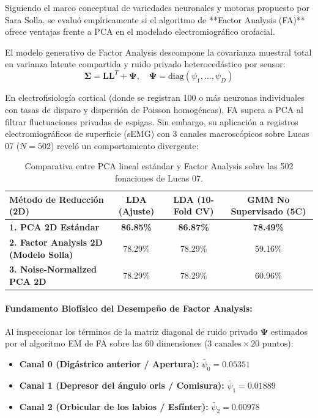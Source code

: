 \documentclass[11pt,a4paper,openany]{book}
\theoremstyle{definition}
\begin{document}
Siguiendo el marco conceptual de variedades neuronales y motoras propuesto por Sara Solla, se evaluó empíricamente si el algoritmo de **Factor Analysis (FA)** ofrece ventajas frente a PCA en el modelado electromiográfico orofacial.

El modelo generativo de Factor Analysis descompone la covarianza muestral total en varianza latente compartida y ruido privado heterocedástico por sensor:
\begin{equation}
\boldsymbol{\Sigma} = \mathbf{L} \mathbf{L}^T + \boldsymbol{\Psi}, \quad \boldsymbol{\Psi} = \text{diag}(\psi_1, \dots, \psi_D)
\end{equation}

En electrofisiología cortical (donde se registran 100 o más neuronas individuales con tasas de disparo y dispersión de Poisson homogéneas), FA supera a PCA al filtrar fluctuaciones privadas de espigas. Sin embargo, su aplicación a registros electromiográficos de superficie (sEMG) con 3 canales macroscópicos sobre Lucas 07 ($N=502$) reveló un comportamiento divergente:

\begin{table}[H]
\centering
\small
\begin{tabular}{lccc}
\toprule
\textbf{Método de Reducción (2D)} & \textbf{LDA (Ajuste)} & \textbf{LDA (10-Fold CV)} & \textbf{GMM No Supervisado (5C)} \\
\midrule
\textbf{1. PCA 2D Estándar} & \textbf{86.85\%} & \textbf{86.87\%} & \textbf{78.49\%} \\
\textbf{2. Factor Analysis 2D (Modelo Solla)} & 78.29\% & 78.29\% & 59.16\% \\
\textbf{3. Noise-Normalized PCA 2D} & 78.29\% & 78.29\% & 60.96\% \\
\bottomrule
\end{tabular}
\caption{Comparativa entre PCA lineal estándar y Factor Analysis sobre las 502 fonaciones de Lucas 07.}
\label{tab:pca_vs_fa_lucas}
\end{table}

\paragraph{Fundamento Biofísico del Desempeño de Factor Analysis:}
Al inspeccionar los términos de la matriz diagonal de ruido privado $\boldsymbol{\Psi}$ estimados por el algoritmo EM de FA sobre las 60 dimensiones ($3 \text{ canales} \times 20 \text{ puntos}$):
\begin{itemize}
    \item \textbf{Canal 0 (Digástrico anterior / Apertura):} $\bar{\psi}_0 = \mathbf{0.05351}$
    \item \textbf{Canal 1 (Depresor del ángulo oris / Comisura):} $\bar{\psi}_1 = 0.01889$
    \item \textbf{Canal 2 (Orbicular de los labios / Esfínter):} $\bar{\psi}_2 = 0.00978$
\end{itemize}
\end{document}
